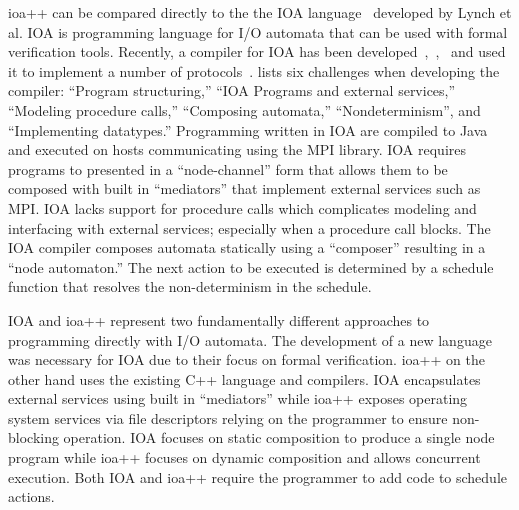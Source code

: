 ioa++ can be compared directly to the the IOA language~\cite{garland2003ioa} developed by Lynch et al.
IOA is programming language for I/O automata that can be used with formal verification tools.
Recently, a compiler for IOA has been developed~\cite{tsai2002code},~\cite{tauber2004verifiable},~\cite{tauber2004compiling} and used it to implement a number of protocols~\cite{georgiou2009automated}.
\cite{georgiou2009automated} lists six challenges when developing the compiler: ``Program structuring,'' ``IOA Programs and external services,'' ``Modeling procedure calls,'' ``Composing automata,'' ``Nondeterminism'', and ``Implementing datatypes.''
Programming written in IOA are compiled to Java and executed on hosts communicating using the MPI library.
IOA requires programs to presented in a ``node-channel'' form that allows them to be composed with built in ``mediators'' that implement external services such as MPI.
IOA lacks support for procedure calls which complicates modeling and interfacing with external services; especially when a procedure call blocks.
The IOA compiler composes automata statically using a ``composer'' resulting in a ``node automaton.''
The next action to be executed is determined by a schedule function that resolves the non-determinism in the schedule.

IOA and ioa++ represent two fundamentally different approaches to programming directly with I/O automata.
The development of a new language was necessary for IOA due to their focus on formal verification.
ioa++ on the other hand uses the existing C++ language and compilers.
IOA encapsulates external services using built in ``mediators'' while ioa++ exposes operating system services via file descriptors relying on the programmer to ensure non-blocking operation.
IOA focuses on static composition to produce a single node program while ioa++ focuses on dynamic composition and allows concurrent execution.
Both IOA and ioa++ require the programmer to add code to schedule actions.










